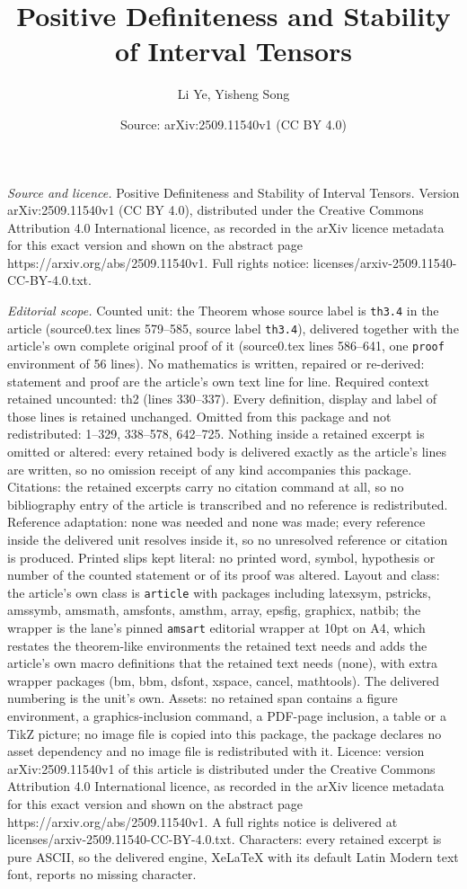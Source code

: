 \documentclass[10pt,a4paper]{amsart}
\title[Positive Definiteness and Stability of Interval Tensors]{Positive Definiteness and Stability of Interval Tensors}
\author{Li Ye, Yisheng Song}
\date{Source: arXiv:2509.11540v1 (CC BY 4.0)}
\begin{document}
\maketitle

\noindent\emph{Source and licence.} Positive Definiteness and Stability of Interval Tensors. Version arXiv:2509.11540v1 (CC BY 4.0), distributed under the Creative Commons Attribution 4.0 International licence, as recorded in the arXiv licence metadata for this exact version and shown on the abstract page https://arxiv.org/abs/2509.11540v1. Full rights notice: licenses/arxiv-2509.11540-CC-BY-4.0.txt.\par\smallskip

\noindent\textit{Editorial scope.} Counted unit: the Theorem whose source label is \texttt{th3.4} in the article (source0.tex lines 579--585, source label \texttt{th3.4}), delivered together with the article's own complete original proof of it (source0.tex lines 586--641, one \texttt{proof} environment of 56 lines). No mathematics is written, repaired or re-derived: statement and proof are the article's own text line for line. Required context retained uncounted: th2 (lines 330--337). Every definition, display and label of those lines is retained unchanged. Omitted from this package and not redistributed: 1--329, 338--578, 642--725. Nothing inside a retained excerpt is omitted or altered: every retained body is delivered exactly as the article's lines are written, so no omission receipt of any kind accompanies this package. Citations: the retained excerpts carry no citation command at all, so no bibliography entry of the article is transcribed and no reference is redistributed. Reference adaptation: none was needed and none was made; every reference inside the delivered unit resolves inside it, so no unresolved reference or citation is produced. Printed slips kept literal: no printed word, symbol, hypothesis or number of the counted statement or of its proof was altered. Layout and class: the article's own class is \texttt{article} with packages including latexsym, pstricks, amssymb, amsmath, amsfonts, amsthm, array, epsfig, graphicx, natbib; the wrapper is the lane's pinned \texttt{amsart} editorial wrapper at 10pt on A4, which restates the theorem-like environments the retained text needs and adds the article's own macro definitions that the retained text needs (none), with extra wrapper packages (bm, bbm, dsfont, xspace, cancel, mathtools). The delivered numbering is the unit's own. Assets: no retained span contains a figure environment, a graphics-inclusion command, a PDF-page inclusion, a table or a TikZ picture; no image file is copied into this package, the package declares no asset dependency and no image file is redistributed with it. Licence: version arXiv:2509.11540v1 of this article is distributed under the Creative Commons Attribution 4.0 International licence, as recorded in the arXiv licence metadata for this exact version and shown on the abstract page https://arxiv.org/abs/2509.11540v1. A full rights notice is delivered at licenses/arxiv-2509.11540-CC-BY-4.0.txt. Characters: every retained excerpt is pure ASCII, so the delivered engine, XeLaTeX with its default Latin Modern text font, reports no missing character.
\end{document}

